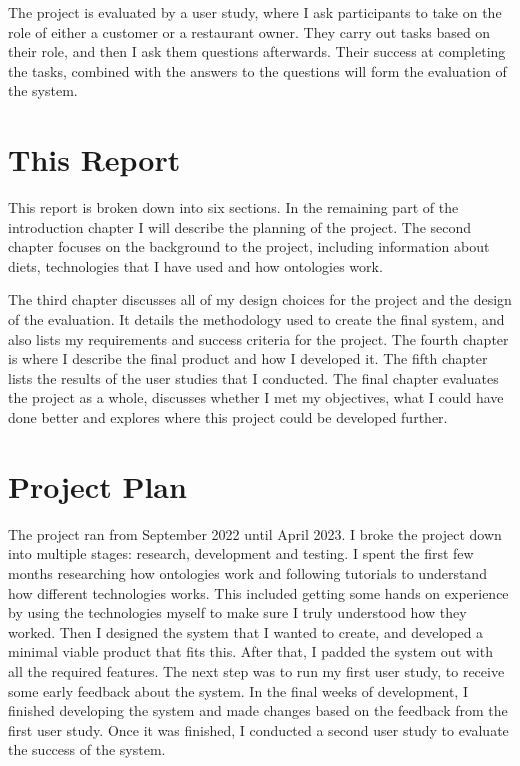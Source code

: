 The project is evaluated by a user study, where I ask participants to take on the role of either a customer or a restaurant owner. They carry out tasks based on their role, and then I ask them questions afterwards. Their success at completing the tasks, combined with the answers to the questions will form the evaluation of the system.

\section{This Report}

This report is broken down into six sections. In the remaining part of the introduction chapter I will describe the planning of the project. The second chapter focuses on the background to the project, including information about diets, technologies that I have used and how ontologies work.

The third chapter discusses all of my design choices for the project and the design of the evaluation. It details the methodology used to create the final system, and also lists my requirements and success criteria for the project. The fourth chapter is where I describe the final product and how I developed it. The fifth chapter lists the results of the user studies that I conducted. The final chapter evaluates the project as a whole, discusses whether I met my objectives, what I could have done better and explores where this project could be developed further.

\section{Project Plan}

The project ran from September 2022 until April 2023. I broke the project down into multiple stages: research, development and testing. I spent the first few months researching how ontologies work and following tutorials to understand how different technologies works. This included getting some hands on experience by using the technologies myself to make sure I truly understood how they worked. Then I designed the system that I wanted to create, and developed a minimal viable product that fits this. After that, I padded the system out with all the required features. The next step was to run my first user study, to receive some early feedback about the system. In the final weeks of development, I finished developing the system and made changes based on the feedback from the first user study. Once it was finished, I conducted a second user study to evaluate the success of the system.


